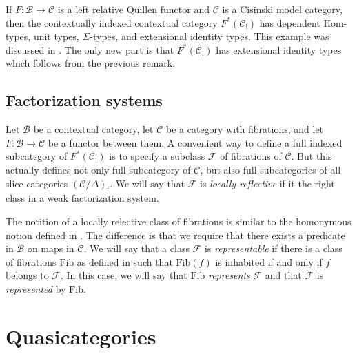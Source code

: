 \documentclass[reqno]{amsart}
\theoremstyle{definition}
\theoremstyle{remark}
\newcommand{\fs}[1]{\mathrm{#1}}
\newcommand{\scat}[1]{\mathcal{#1}}
\newcommand{\Fib}{\mathcal{F}}
\newcommand{\Hom}{\fs{Hom}}
\numberwithin{figure}{section}
\begin{document}
\begin{example}
If $F : \scat{B} \to \scat{C}$ is a left relative Quillen functor and $\scat{C}$ is a Cisinski model category, then 
the contextually indexed contextual category $F^*(\scat{C}_!)$ has dependent $\Hom$-types, unit types, $\Sigma$-types, and extensional identity types.
This example was discussed in .
The only new part is that $F^*(\scat{C}_!)$ has extensional identity types which follows from the previous remark.
\end{example}

\subsection{Factorization systems}

Let $\scat{B}$ be a contextual category, let $\scat{C}$ be a category with fibrations, and let $F : \scat{B} \to \scat{C}$ be a functor between them.
A convenient way to define a full indexed subcategory of $F^*(\scat{C}_!)$ is to specify a subclass $\Fib$ of fibrations of $\scat{C}$.
But this actually defines not only full subcategory of $\scat{C}$, but also full subcategories of all slice categories $(\scat{C}/\Delta)_\fs{f}$.
We will say that $\Fib$ is \emph{locally reflective} if it the right class in a weak factorization system.

The notition of a locally relective class of fibrations is similar to the homonymous notion defined in \cite[Subsection~10.1]{indexed-tt}.
The difference is that we require that there exists a predicate in $\scat{B}$ on maps in $\scat{C}$.
We will say that a class $\Fib$ is \emph{representable} if there is a class of fibrations $\fs{Fib}$ as defined in \cite[Subsection~9.2]{indexed-tt} such that $\fs{Fib}(f)$ is inhabited if and only if $f$ belongs to $\Fib$.
In this case, we will say that $\fs{Fib}$ \emph{represents} $\Fib$ and that $\Fib$ is \emph{represented} by $\fs{Fib}$.


\section{Quasicategories}



\end{document}
